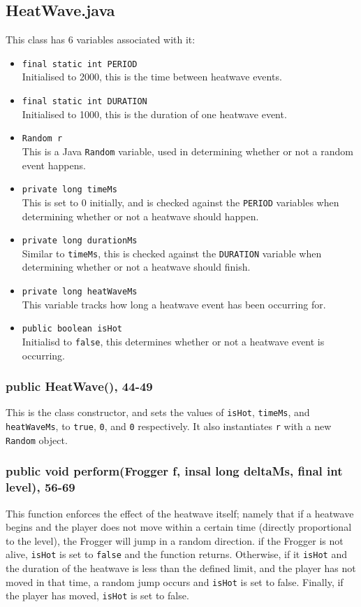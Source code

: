 \documentclass[12pt]{article}
\begin{document}
\subsection{HeatWave.java}
This class has 6 variables associated with it:
\begin{itemize}
  \item \verb|final static int PERIOD|\\
        Initialised to 2000, this is the time between heatwave events.
  \item \verb|final static int DURATION|\\
        Initialised to 1000, this is the duration of one heatwave event.
  \item \verb|Random r|\\
        This is a Java \verb|Random| variable, used in determining whether or not a random event happens.
  \item \verb|private long timeMs|\\
        This is set to 0 initially, and is checked against the \verb|PERIOD| variables when determining whether or not a heatwave should happen.
  \item \verb|private long durationMs|\\
        Similar to \verb|timeMs|, this is checked against the \verb|DURATION| variable when determining whether or not a heatwave should finish.
  \item \verb|private long heatWaveMs|\\
        This variable tracks how long a heatwave event has been occurring for.
  \item \verb|public boolean isHot|\\
        Initialisd to \verb|false|, this determines whether or not a heatwave event is occurring.
\end{itemize}

\subsubsection{public HeatWave(), 44-49}
This is the class constructor, and sets the values of \verb|isHot|, \verb|timeMs|, and \verb|heatWaveMs|, to \verb|true|, \verb|0|, and \verb|0| respectively.
It also instantiates \verb|r| with a new \verb|Random| object.

\subsubsection{public void perform(Frogger f, insal long deltaMs, final int level), 56-69}
This function enforces the effect of the heatwave itself; namely that if a heatwave begins and the player does not move within a certain time (directly proportional to the level), the Frogger will jump in a random direction.
if the Frogger is not alive, \verb|isHot| is set to \verb|false| and the function returns.
Otherwise, if it \verb|isHot| and the duration of the heatwave is less than the defined limit, and the player has not moved in that time, a random jump occurs and \verb|isHot| is set to false.
Finally, if the player has moved, \verb|isHot| is set to false.
\end{document}
